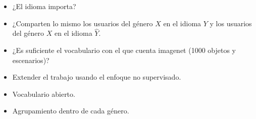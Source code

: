 \documentclass[runningheads]{llncs}
\begin{document}
\begin{itemize}
    \item ¿El idioma importa? 
    \item ¿Comparten lo mismo los usuarios del género $X$ en el idioma
    $Y$ y los usuarios del género $X$ en el idioma $\hat{Y}$.
    \item ¿Es suficiente el vocabulario con el que cuenta imagenet
    (1000 objetos y escenarios)?
    \item Extender el trabajo usando el enfoque no supervisado.
    \item Vocabulario abierto.
    \item Agrupamiento dentro de cada género.
\end{itemize}



\end{document}
